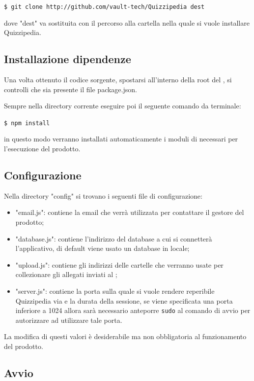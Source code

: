 \documentclass[a4paper, titlepage]{article}
\begin{document}
	\texttt{\$ git clone http://github.com/vault-tech/Quizzipedia dest}

	dove "dest" va sostituita con il percorso alla cartella nella quale si vuole installare Quizzipedia.

	\subsection{Installazione dipendenze}
	
	Una volta ottenuto il codice sorgente, spostarsi all'interno della root del , si controlli che sia presente il file package.json.
	
	Sempre nella directory corrente eseguire poi il seguente comando da terminale:
	
	\texttt{\$ npm install}
	
	in questo modo verranno installati automaticamente i moduli di  necessari per l'esecuzione del prodotto.
	
	\subsection{Configurazione}
	Nella directory "config" si trovano i seguenti file di configurazione:
	\begin{itemize}
		\item "email.js": contiene la email che verrà utilizzata per contattare il gestore del prodotto;
		\item "database.js": contiene l'indirizzo del database a cui si connetterà l'applicativo, di default viene usato un database in locale;
		\item "upload.js": contiene gli indirizzi delle cartelle che verranno usate per collezionare gli allegati inviati al ;
		\item "server.js": contiene la porta sulla quale si vuole rendere reperibile Quizzipedia via  e la durata della sessione,
		se viene specificata una porta inferiore a 1024 allora sarà necessario anteporre \texttt{sudo} al comando di avvio per autorizzare  ad utilizzare tale porta.
	\end{itemize}
	La modifica di questi valori è desiderabile ma non obbligatoria al funzionamento del prodotto.
	
	\subsection{Avvio}
	
\end{document}
